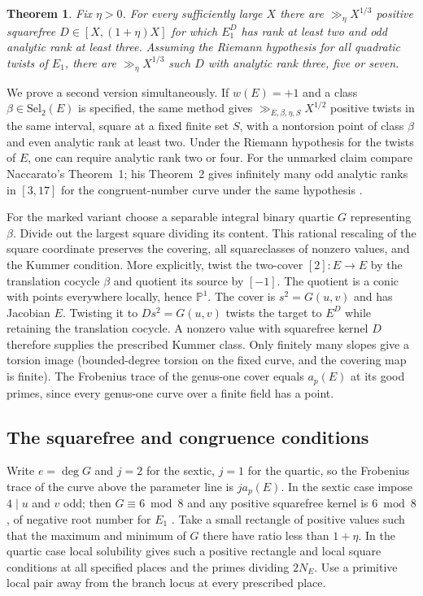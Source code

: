 \documentclass[11pt]{article}
\newtheorem{theorem}{Theorem}[section]\newtheorem{lemma}[theorem]{Lemma}
\begin{document}
\begin{theorem}\label{count}
Fix $\eta>0$. For every sufficiently large $X$ there are $\gg_\eta X^{1/3}$ positive squarefree $D\in[X,(1+\eta)X]$ for which $E_1^D$ has rank at least two and odd analytic rank at least three. Assuming the Riemann hypothesis for all quadratic twists of $E_1$, there are $\gg_\eta X^{1/3}$ such $D$ with analytic rank three, five or seven.
\end{theorem}
We prove a second version simultaneously. If $w(E)=+1$ and a class $\beta\in\mathrm{Sel}_2(E)$ is specified, the same method gives $\gg_{E,\beta,\eta,S}X^{1/2}$ positive twists in the same interval, square at a fixed finite set $S$, with a nontorsion point of class $\beta$ and even analytic rank at least two. Under the Riemann hypothesis for the twists of $E$, one can require analytic rank two or four. For the unmarked claim compare Naccarato's Theorem~1; his Theorem~2 gives infinitely many odd analytic ranks in $[3,17]$ for the congruent-number curve under the same hypothesis \cite{nacc}.

For the marked variant choose a separable integral binary quartic $G$ representing $\beta$. Divide out the largest square dividing its content. This rational rescaling of the square coordinate preserves the covering, all squareclasses of nonzero values, and the Kummer condition. More explicitly, twist the two-cover $[2]:E\to E$ by the translation cocycle $\beta$ and quotient its source by $[-1]$. The quotient is a conic with points everywhere locally, hence $\mathbb P^1$. The cover is $s^2=G(u,v)$ and has Jacobian $E$. Twisting it to $D s^2=G(u,v)$ twists the target to $E^D$ while retaining the translation cocycle. A nonzero value with squarefree kernel $D$ therefore supplies the prescribed Kummer class. Only finitely many slopes give a torsion image (bounded-degree torsion on the fixed curve, and the covering map is finite). The Frobenius trace of the genus-one cover equals $a_p(E)$ at its good primes, since every genus-one curve over a finite field has a point.

\subsection{The squarefree and congruence conditions}
Write $e=\deg G$ and $j=2$ for the sextic, $j=1$ for the quartic, so the Frobenius trace of the curve above the parameter line is $j a_p(E)$. In the sextic case impose $4\mid u$ and $v$ odd; then $G\equiv6\bmod 8$ and any positive squarefree kernel is $6\bmod8$, of negative root number for $E_1$ \cite{elkies}. Take a small rectangle of positive values such that the maximum and minimum of $G$ there have ratio less than $1+\eta$. In the quartic case local solubility gives such a positive rectangle and local square conditions at all specified places and the primes dividing $2N_E$. Use a primitive local pair away from the branch locus at every prescribed place.
\end{document}
